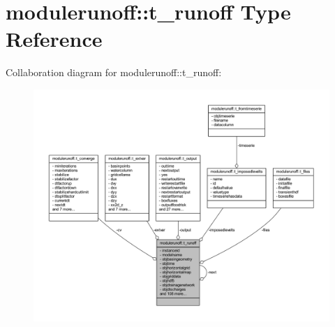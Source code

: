 \hypertarget{structmodulerunoff_1_1t__runoff}{}\section{modulerunoff\+:\+:t\+\_\+runoff Type Reference}
\label{structmodulerunoff_1_1t__runoff}


Collaboration diagram for modulerunoff\+:\+:t\+\_\+runoff\+:\nopagebreak
\begin{figure}[H]
\begin{center}
\leavevmode
\includegraphics[width=350pt]{structmodulerunoff_1_1t__runoff__coll__graph}
\end{center}
\end{figure}
